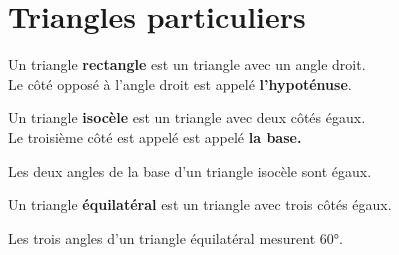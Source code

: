 \section{Triangles particuliers}

{Un triangle \textbf{rectangle} est un triangle avec un angle droit.\\
Le côté opposé à l'angle droit est appelé \textbf{ l'hypoténuse}.}

{Un triangle \textbf{isocèle} est un triangle avec deux côtés égaux.\\
Le troisième côté est appelé est appelé \textbf{la base.}}

{Les deux angles de la base d'un triangle isocèle sont égaux.}

{Un triangle \textbf{équilatéral} est un triangle avec trois côtés égaux.}

{Les trois angles d'un triangle équilatéral mesurent 60°.}